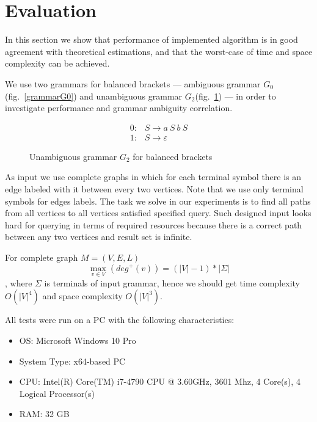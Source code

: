 \section{Evaluation}

In this section we show that performance of implemented algorithm is in good agreement with theoretical estimations, and that the worst-case of time and space complexity can be achieved.  

We use two grammars for balanced brackets --- ambiguous grammar $G_0$(fig.~\ref{grammarG0}) and unambiguous grammar $G_2$(fig.~\ref{grammarG2}) --- in order to investigate performance and grammar ambiguity correlation.

\begin{figure}[ht]
   \begin{center}
   \[
\begin{array}{rl}
   0: & S \rightarrow a \ S \ b \ S \\ 
   1: & S \rightarrow \varepsilon
\end{array}
\]
   \caption{Unambiguous grammar $G_2$ for balanced brackets}
   \label{grammarG2}        
   \end{center}
\end{figure}

As input we use complete graphs in which for each terminal symbol there is an edge labeled with it between every two vertices.
Note that we use only terminal symbols for edges labels.  
The task we solve in our experiments is to find all paths from all vertices to all vertices satisfied specified query.
Such designed input looks hard for querying in terms of required resources because there is a correct path between any two vertices and result set is infinite.

For complete graph $M=(V,E,L)$ $$\max\limits_{v \in V}\left(deg^+\left(v\right)\right) = (|V| - 1)*|\Sigma|$$, where $\Sigma$ is terminals of input grammar, hence we should get time complexity $O(|V|^4)$ and space complexity $O(|V|^3)$.

All tests were run on a PC with the following characteristics:
\begin{itemize}
\item OS: Microsoft Windows 10 Pro
\item System Type: x64-based PC
\item CPU: Intel(R) Core(TM) i7-4790 CPU @ 3.60GHz, 3601 Mhz, 4 Core(s), 4 Logical Processor(s)
\item RAM: 32 GB
\end{itemize}

